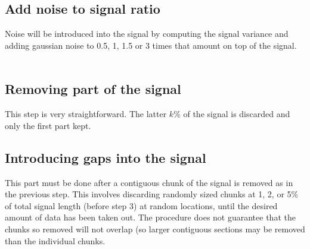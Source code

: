 		
		\subsection{Add noise to signal ratio}
		Noise will be introduced into the signal by computing the signal variance and adding gaussian noise to 0.5, 1, 1.5 or 3 times that amount on top of the signal. \\ \\
		
		
		
		\subsection{Removing part of the signal}
		This step is very straightforward. The latter $k\%$ of the signal is discarded and only the first part kept.
		
		
		
		\subsection{Introducing gaps into the signal}
		This part must be done after a contiguous chunk of the signal is removed as in the previous step. This involves discarding randomly sized chunks at 1, 2, or 5\% of total signal length (before step 3) at random locations, until the desired amount of data has been taken out. The procedure does not guarantee that the chunks so removed will not overlap (so larger contiguous sections may be removed than the individual chunks.  %
		
		
		
%
